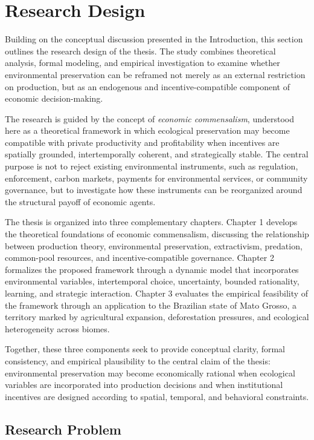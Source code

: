 \section{Research Design}

Building on the conceptual discussion presented in the Introduction, this section outlines the research design of the thesis. The study combines theoretical analysis, formal modeling, and empirical investigation to examine whether environmental preservation can be reframed not merely as an external restriction on production, but as an endogenous and incentive-compatible component of economic decision-making.

The research is guided by the concept of \emph{economic commensalism}, understood here as a theoretical framework in which ecological preservation may become compatible with private productivity and profitability when incentives are spatially grounded, intertemporally coherent, and strategically stable. The central purpose is not to reject existing environmental instruments, such as regulation, enforcement, carbon markets, payments for environmental services, or community governance, but to investigate how these instruments can be reorganized around the structural payoff of economic agents.

The thesis is organized into three complementary chapters. Chapter 1 develops the theoretical foundations of economic commensalism, discussing the relationship between production theory, environmental preservation, extractivism, predation, common-pool resources, and incentive-compatible governance. Chapter 2 formalizes the proposed framework through a dynamic model that incorporates environmental variables, intertemporal choice, uncertainty, bounded rationality, learning, and strategic interaction. Chapter 3 evaluates the empirical feasibility of the framework through an application to the Brazilian state of Mato Grosso, a territory marked by agricultural expansion, deforestation pressures, and ecological heterogeneity across biomes.

Together, these three components seek to provide conceptual clarity, formal consistency, and empirical plausibility to the central claim of the thesis: environmental preservation may become economically rational when ecological variables are incorporated into production decisions and when institutional incentives are designed according to spatial, temporal, and behavioral constraints.

\subsection{Research Problem}

